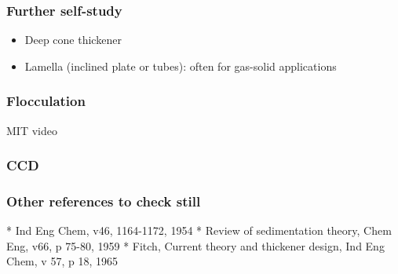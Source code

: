\begin{frame}\frametitle{Further self-study}
	\begin{itemize}
		\item	Deep cone thickener
		\item	Lamella (inclined plate or tubes): often for gas-solid applications 
				\vspace{12pt}
	\end{itemize}
\end{frame}

\begin{frame}\frametitle{Flocculation}
	MIT video
\end{frame}

\begin{frame}\frametitle{CCD}
	
\end{frame}

\begin{frame}\frametitle{Other references to check still}
	* Ind Eng Chem, v46, 1164-1172, 1954
	* Review of sedimentation theory, Chem Eng, v66, p 75-80, 1959
	* Fitch, Current theory and thickener design, Ind Eng Chem, v 57, p 18, 1965
	
\end{frame}